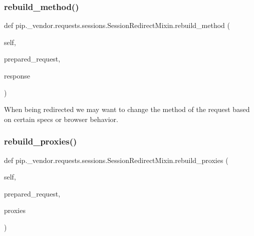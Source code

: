 \subsubsection{\texorpdfstring{rebuild\+\_\+method()}{rebuild\_method()}}
{\footnotesize\ttfamily def pip.\+\_\+vendor.\+requests.\+sessions.\+Session\+Redirect\+Mixin.\+rebuild\+\_\+method (\begin{DoxyParamCaption}\item[{}]{self,  }\item[{}]{prepared\+\_\+request,  }\item[{}]{response }\end{DoxyParamCaption})}

\begin{DoxyVerb}When being redirected we may want to change the method of the request
based on certain specs or browser behavior.
\end{DoxyVerb}
 \mbox{\label{classpip_1_1__vendor_1_1requests_1_1sessions_1_1SessionRedirectMixin_a2a67ad5a8d6f5df4156952713771c761}} 
\subsubsection{\texorpdfstring{rebuild\+\_\+proxies()}{rebuild\_proxies()}}
{\footnotesize\ttfamily def pip.\+\_\+vendor.\+requests.\+sessions.\+Session\+Redirect\+Mixin.\+rebuild\+\_\+proxies (\begin{DoxyParamCaption}\item[{}]{self,  }\item[{}]{prepared\+\_\+request,  }\item[{}]{proxies }\end{DoxyParamCaption})}

